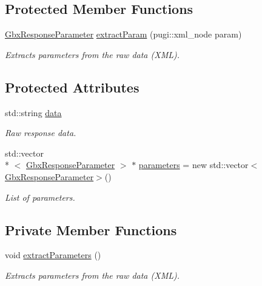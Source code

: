 \subsection*{Protected Member Functions}
\begin{DoxyCompactItemize}
\item 
\hyperlink{classGbxResponseParameter}{Gbx\-Response\-Parameter} \hyperlink{classGbxServerResponse_a22433a652ce9d4c7e9b834aa60c93c37}{extract\-Param} (pugi\-::xml\-\_\-node param)
\begin{DoxyCompactList}\small\item\em Extracts parameters from the raw data (X\-M\-L). \end{DoxyCompactList}\end{DoxyCompactItemize}
\subsection*{Protected Attributes}
\begin{DoxyCompactItemize}
\item 
std\-::string \hyperlink{classGbxServerResponse_a91567866239d733819125c3b3b9948c6}{data}
\begin{DoxyCompactList}\small\item\em Raw response data. \end{DoxyCompactList}\item 
std\-::vector\\*
$<$ \hyperlink{classGbxResponseParameter}{Gbx\-Response\-Parameter} $>$ $\ast$ \hyperlink{classGbxServerResponse_ad6fef5319c4da9461f4cd0d72d8b5ee8}{parameters} = new std\-::vector$<$\hyperlink{classGbxResponseParameter}{Gbx\-Response\-Parameter}$>$()
\begin{DoxyCompactList}\small\item\em List of parameters. \end{DoxyCompactList}\end{DoxyCompactItemize}
\subsection*{Private Member Functions}
\begin{DoxyCompactItemize}
\item 
void \hyperlink{classGbxCallBack_a0a9b9db5ebdc8040058b542fb51283d7}{extract\-Parameters} ()
\begin{DoxyCompactList}\small\item\em Extracts parameters from the raw data (X\-M\-L). \end{DoxyCompactList}\end{DoxyCompactItemize}
